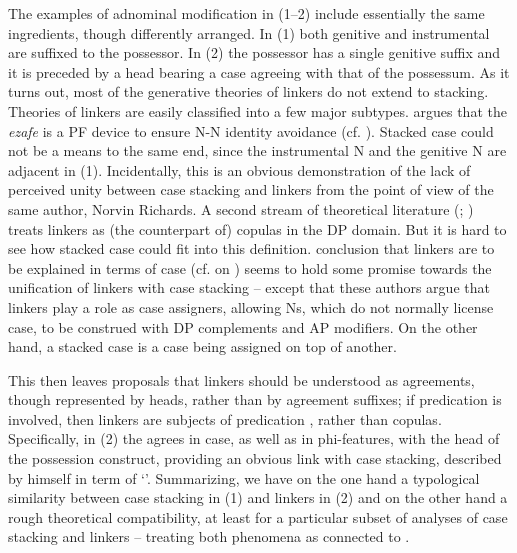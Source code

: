 \documentclass[output=paper]{langsci/langscibook}
\begin{document}
The examples of adnominal modification in (1--2) include essentially the same ingredients, though differently arranged. In (1) both genitive and instrumental are suffixed to the possessor. In (2) the possessor has a single genitive suffix and it is preceded by a head bearing a case agreeing with that of the possessum. As it turns out, most of the generative theories of linkers do not extend to stacking. Theories of linkers are easily classified into a few major subtypes. \citet{Richards2010} argues that the  \textit{ezafe} is a PF device to ensure N-N identity avoidance (cf. \citealt{Ghomeshi1997}). Stacked case could not be a means to the same end, since the instrumental N and the genitive N are adjacent in (1). Incidentally, this is an obvious demonstration of the lack of perceived unity between case stacking and linkers from the point of view of the same author, Norvin Richards. A second stream of theoretical literature (\citealt{Dikken2004}; \citealt{Campos2005}) treats linkers as (the counterpart of) copulas in the DP domain. But it is hard to see how stacked case could fit into this definition.  conclusion that linkers are to be explained in terms of case (cf. \citealt{Samiian1994} on ) seems to hold some promise towards the unification of linkers with case stacking – except that these authors argue that linkers play a role as case assigners, allowing Ns, which do not normally license case, to be construed with DP complements and AP modifiers. On the other hand, a stacked case is a case being assigned on top of another. 

This then leaves proposals \citep{Philip2012} that linkers should be understood as agreements, though represented by heads, rather than by agreement suffixes; if predication is involved, then linkers are subjects of predication \citep{Franco2015}, rather than copulas. Specifically, in  (2) the  agrees in case, as well as in phi-features, with the head of the possession construct, providing an obvious link with case stacking, described by \citet{Richards2013} himself in term of ‘’. Summarizing, we have on the one hand a typological similarity between case stacking in (1) and linkers in (2) and on the other hand a rough theoretical compatibility, at least for a particular subset of analyses of case stacking and linkers – treating both phenomena as connected to . 
\end{document}
